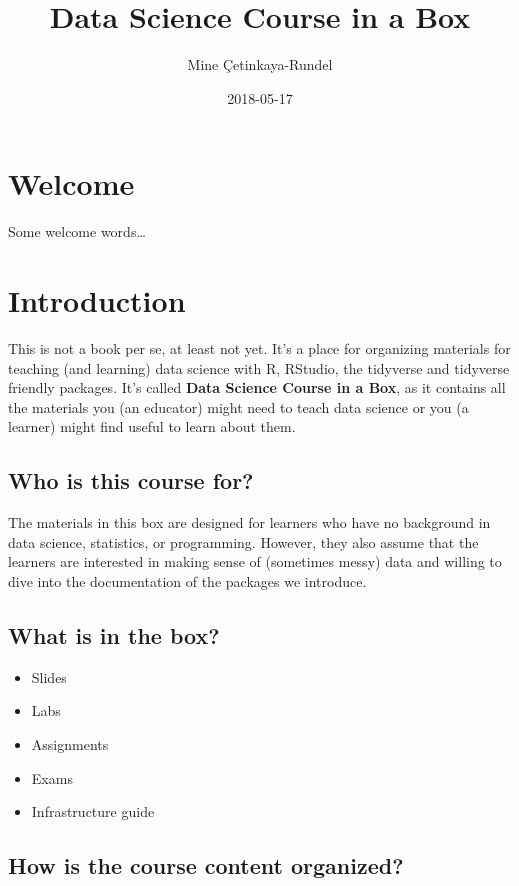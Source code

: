 \documentclass[]{book}
\title{Data Science Course in a Box}
\author{Mine Çetinkaya-Rundel}
\date{2018-05-17}
\providecommand{\tightlist}{%
  \setlength{\itemsep}{0pt}\setlength{\parskip}{0pt}}
\theoremstyle{definition}
\theoremstyle{definition}
\theoremstyle{definition}
\theoremstyle{remark}
\begin{document}
\maketitle

{
\setcounter{tocdepth}{1}
\tableofcontents
}
\chapter*{Welcome}\label{welcome}

Some welcome words\ldots{}

\chapter{Introduction}\label{intro}

This is not a book per se, at least not yet. It's a place for organizing
materials for teaching (and learning) data science with R, RStudio, the
tidyverse and tidyverse friendly packages. It's called \textbf{Data
Science Course in a Box}, as it contains all the materials you (an
educator) might need to teach data science or you (a learner) might find
useful to learn about them.

\section{Who is this course for?}\label{who-is-this-course-for}

The materials in this box are designed for learners who have no
background in data science, statistics, or programming. However, they
also assume that the learners are interested in making sense of
(sometimes messy) data and willing to dive into the documentation of the
packages we introduce.

\section{What is in the box?}\label{what-is-in-the-box}

\begin{itemize}
\tightlist
\item
  Slides
\item
  Labs
\item
  Assignments
\item
  Exams
\item
  Infrastructure guide
\end{itemize}

\section{How is the course content
organized?}\label{how-is-the-course-content-organized}
\end{document}
